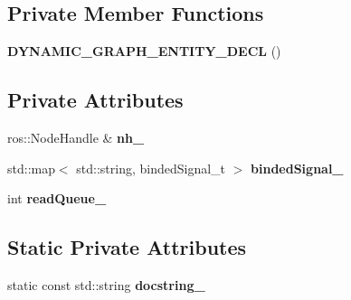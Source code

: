 \subsection*{Private Member Functions}
\begin{DoxyCompactItemize}
\item 
{\bfseries D\+Y\+N\+A\+M\+I\+C\+\_\+\+G\+R\+A\+P\+H\+\_\+\+E\+N\+T\+I\+T\+Y\+\_\+\+D\+E\+CL} ()\hypertarget{classdynamic__graph_1_1RosQueuedSubscribe_a3d52d1de001cc0b71410b3da7429a751}{}\label{classdynamic__graph_1_1RosQueuedSubscribe_a3d52d1de001cc0b71410b3da7429a751}

\end{DoxyCompactItemize}
\subsection*{Private Attributes}
\begin{DoxyCompactItemize}
\item 
ros\+::\+Node\+Handle \& {\bfseries nh\+\_\+}\hypertarget{classdynamic__graph_1_1RosQueuedSubscribe_a4795502ea5dc4f01158b850cc3f63f00}{}\label{classdynamic__graph_1_1RosQueuedSubscribe_a4795502ea5dc4f01158b850cc3f63f00}

\item 
std\+::map$<$ std\+::string, binded\+Signal\+\_\+t $>$ {\bfseries binded\+Signal\+\_\+}\hypertarget{classdynamic__graph_1_1RosQueuedSubscribe_acb4476833404b04da8012ed5a4c84150}{}\label{classdynamic__graph_1_1RosQueuedSubscribe_acb4476833404b04da8012ed5a4c84150}

\item 
int {\bfseries read\+Queue\+\_\+}\hypertarget{classdynamic__graph_1_1RosQueuedSubscribe_a264c8494a5545e63679ad0bfdb4dd614}{}\label{classdynamic__graph_1_1RosQueuedSubscribe_a264c8494a5545e63679ad0bfdb4dd614}

\end{DoxyCompactItemize}
\subsection*{Static Private Attributes}
\begin{DoxyCompactItemize}
\item 
static const std\+::string {\bfseries docstring\+\_\+}\hypertarget{classdynamic__graph_1_1RosQueuedSubscribe_a07f6aa0c68e2a97c04fce2b001c41f75}{}\label{classdynamic__graph_1_1RosQueuedSubscribe_a07f6aa0c68e2a97c04fce2b001c41f75}

\end{DoxyCompactItemize}

